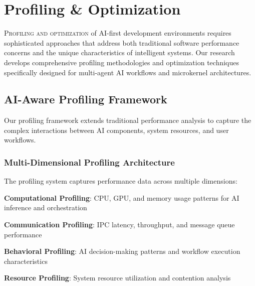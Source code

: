 
\section*{Profiling \& Optimization}

\lettrine{P}{rofiling and optimization} of AI-first development environments requires sophisticated approaches that address both traditional software performance concerns and the unique characteristics of intelligent systems. Our research develops comprehensive profiling methodologies and optimization techniques specifically designed for multi-agent AI workflows and microkernel architectures.

\subsection*{AI-Aware Profiling Framework}

Our profiling framework extends traditional performance analysis to capture the complex interactions between AI components, system resources, and user workflows.

\subsubsection*{Multi-Dimensional Profiling Architecture}

The profiling system captures performance data across multiple dimensions:

\begin{expandedlist}
    \item \textbf{Computational Profiling}: CPU, GPU, and memory usage patterns for AI inference and orchestration
    \item \textbf{Communication Profiling}: IPC latency, throughput, and message queue performance
    \item \textbf{Behavioral Profiling}: AI decision-making patterns and workflow execution characteristics
    \item \textbf{Resource Profiling}: System resource utilization and contention analysis
\end{expandedlist}

